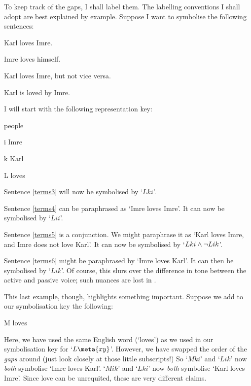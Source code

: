 To keep track of the gaps, I shall label them. The labelling conventions I shall adopt are best explained by example. Suppose I want to symbolise the following sentences:
	\begin{earg}
		\item[\ex{terms3}] Karl loves Imre.
		\item[\ex{terms4}] Imre loves himself.
		\item[\ex{terms5}] Karl loves Imre, but not vice versa.
		\item[\ex{terms6}] Karl is loved by Imre.
	\end{earg}
I will start with the following representation key:
	\begin{ekey}
		\item[\text{domain}] people
		\item[i] Imre
		\item[k] Karl
		\item[L\meta{xy}]  loves 
	\end{ekey}
Sentence \ref{terms3} will now be symbolised by `$Lki$'. 

Sentence \ref{terms4} can be paraphrased as `Imre loves Imre'. It can now be symbolised by `$Lii$'. 

Sentence \ref{terms5} is a conjunction. We might paraphrase it as `Karl loves Imre, and Imre does not love Karl'. It can now be symbolised by `$Lki \wedge \neg Lik$'. 

Sentence \ref{terms6} might be paraphrased by `Imre loves Karl'. It can then be symbolised by `$Lik$'. Of course, this slurs over the difference in tone between the active and passive voice; such nuances are lost in \FOL. 

This last example, though, highlights something important. Suppose we add to our symbolisation key the following:
	\begin{ekey}
		\item[M\meta{xy}]  loves \gap{x}
	\end{ekey}
Here, we have used the same English word (`loves') as we used in our symbolisation key for `$L\meta{xy}$'. However, we have swapped the order of the \emph{gaps} around (just look closely at those little subscripts!) So `$Mki$' and `$Lik$' now \emph{both} symbolise `Imre loves Karl'. `$Mik$' and `$Lki$' now \emph{both} symbolise `Karl loves Imre'. Since love can be unrequited, these are very different claims. 

